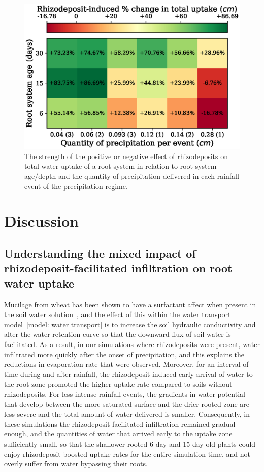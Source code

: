 \documentclass[11pt,a4paper]{article}
\numberwithin{equation}{section}
\begin{document}
\begin{figure}
	\includegraphics[width = 1.0\linewidth, keepaspectratio]{age_vs_rain_per_event.eps}
	\caption{The strength of the positive or negative effect of rhizodeposits on total water uptake of a root system in relation to root system age/depth and the quantity of precipitation delivered in each rainfall event of the precipitation regime.}
	\label{figure: uptake_age_intensity}
\end{figure}

\section{Discussion}

\subsection{Understanding the mixed impact of rhizodeposit-facilitated infiltration on root water uptake}
Mucilage from wheat has been shown to have a surfactant affect when present in the soil water solution~\citep{read2003plant}, and the effect of this within the water transport model~\eqref{model: water transport} is to increase the soil hydraulic conductivity and alter the water retention curve so that the downward flux of soil water is facilitated. As a result, in our simulations where rhizodeposits were present, water infiltrated more quickly after the onset of precipitation, and this explains the reductions in evaporation rate that were observed. Moreover, for an interval of time during and after rainfall, the rhizodeposit-induced early arrival of water to the root zone promoted the higher uptake rate compared to soils without rhizodeposits. For less intense rainfall events, the gradients in water potential that develop between the more saturated surface and the drier rooted zone are less severe and the total amount of water delivered is smaller. Consequently, in these simulations the rhizodeposit-facilitated infiltration remained gradual enough, and the quantities of water that arrived early to the uptake zone sufficiently small, so that the shallower-rooted 6-day and 15-day old plants could enjoy rhizodeposit-boosted uptake rates for the entire simulation time, and not overly suffer from water bypassing their roots.
\end{document}
